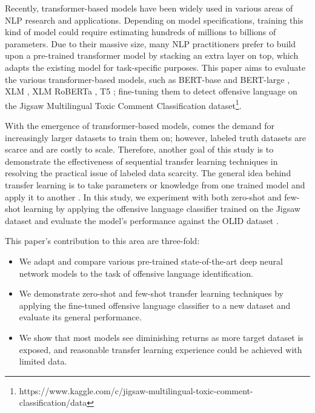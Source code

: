 \documentclass[11pt,a4paper]{article}
\begin{document}
Recently, transformer-based models \citep{DBLP:journals/corr/VaswaniSPUJGKP17} have been widely used in various areas of NLP research and applications. Depending on model specifications, training this kind of model could require estimating hundreds of millions to billions of parameters. Due to their massive size, many NLP practitioners prefer to build upon a pre-trained transformer model by stacking an extra layer on top, which adapts the existing model for task-specific purposes. This paper aims to evaluate the various transformer-based models, such as BERT-base and BERT-large \citep{DBLP:journals/corr/abs-1810-04805}, XLM \citep{DBLP:journals/corr/abs-1901-07291}, XLM RoBERTa \citep{conneau2019unsupervised}, T5 \citep{raffel2019exploring}; fine-tuning them to detect offensive language on the Jigsaw Multilingual Toxic Comment Classification dataset\footnote{https://www.kaggle.com/c/jigsaw-multilingual-toxic-comment-classification/data}.

With the emergence of transformer-based models, comes the demand for increasingly larger datasets to train them on; however, labeled truth datasets are scarce and are costly to scale. Therefore, another goal of this study is to demonstrate the effectiveness of sequential transfer learning techniques in resolving the practical issue of labeled data scarcity. The general idea behind transfer learning is to take parameters or knowledge from one trained model and apply it to another \citep{ruder-etal-2019-transfer}. In this study, we experiment with both zero-shot and few-shot learning by applying the offensive language classifier trained on the Jigsaw dataset and evaluate the model's performance against the OLID dataset \citep{zampieri-etal-2019-predicting}. 

This paper’s contribution to this area are three-fold: 

\begin{itemize}
  \item We adapt and compare various pre-trained state-of-the-art deep neural network models to the task of offensive language identification.
  \item We demonstrate zero-shot and few-shot transfer learning techniques by applying the fine-tuned offensive language classifier to a new dataset and evaluate its general performance. 
  \item We show that most models see diminishing returns as more target dataset is exposed, and reasonable transfer learning experience could be achieved with limited data. 
\end{itemize}
\end{document}
